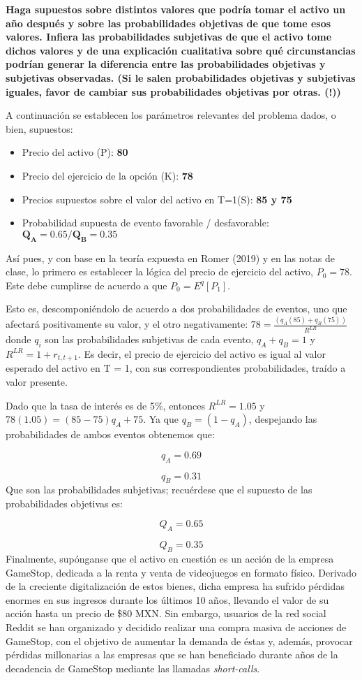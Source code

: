 \documentclass[
]{article}
\begin{document}
\textbf{Haga supuestos sobre distintos valores que podría tomar el
activo un año después y sobre las probabilidades objetivas de que tome
esos valores. Infiera las probabilidades subjetivas de que el activo
tome dichos valores y de una explicación cualitativa sobre qué
circunstancias podrían generar la diferencia entre las probabilidades
objetivas y subjetivas observadas. (Si le salen probabilidades objetivas
y subjetivas iguales, favor de cambiar sus probabilidades objetivas por
otras. (!))}

A continuación se establecen los parámetros relevantes del problema
dados, o bien, supuestos:

\begin{itemize}
\item
  Precio del activo (P): \textbf{80}
\item
  Precio del ejercicio de la opción (K): \textbf{78}
\item
  Precios supuestos sobre el valor del activo en T=1(S): \textbf{85 y
  75}
\item
  Probabilidad supuesta de evento favorable / desfavorable:
  \(\mathbf{Q_{A} =0.65 / Q_{B} = 0.35}\)
\end{itemize}

Así pues, y con base en la teoría expuesta en Romer (2019) y en las
notas de clase, lo primero es establecer la lógica del precio de
ejercicio del activo, \(P_{0} = 78\). Este debe cumplirse de acuerdo a
que \(P_{0} = E^q[P_{1}]\).

Esto es, descomponiéndolo de acuerdo a dos probabilidades de eventos,
uno que afectará positivamente su valor, y el otro negativamente:
\(78 = \frac{(q_{A}(85) + q_{B}(75))}{R^{LR}}\) donde \(q_{i}\) son las
probabilidades subjetivas de cada evento, \(q_{A} + q_{B} = 1\) y
\(R^{LR} = 1 + r_{t,t+1}\). Es decir, el precio de ejercicio del activo
es igual al valor esperado del activo en T = 1, con sus correspondientes
probabilidades, traído a valor presente.

Dado que la tasa de interés es de 5\%, entonces \(R^{LR} = 1.05\) y
\(78(1.05) = (85 - 75)q_{A} + 75\). Ya que \(q_{B} = (1-q_{A})\),
despejando las probabilidades de ambos eventos obtenemos que:

\[q_{A} = 0.69\]

\[q_{B} = 0.31\] Que son las probabilidades subjetivas; recuérdese que
el supuesto de las probabilidades objetivas es:

\[ Q_{A} = 0.65\]

\[Q_{B} = 0.35\] Finalmente, supónganse que el activo en cuestión es un
acción de la empresa GameStop, dedicada a la renta y venta de
videojuegos en formato físico. Derivado de la creciente digitalización
de estos bienes, dicha empresa ha sufrido pérdidas enormes en sus
ingresos durante los últimos 10 años, llevando el valor de su acción
hasta un precio de \$80 MXN. Sin embargo, usuarios de la red social
Reddit se han organizado y decidido realizar una compra masiva de
acciones de GameStop, con el objetivo de aumentar la demanda de éstas y,
además, provocar pérdidas millonarias a las empresas que se han
beneficiado durante años de la decadencia de GameStop mediante las
llamadas \emph{short-calls}.
\end{document}
